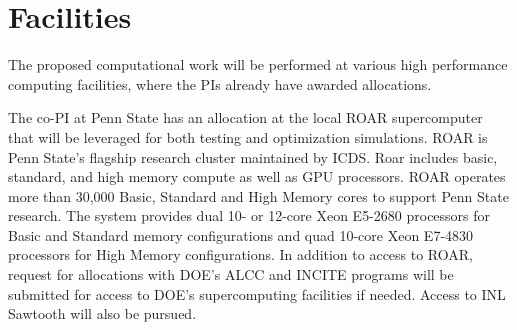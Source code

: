 \section{Facilities}
The proposed computational work will be performed at various high performance computing facilities, where the PIs already have awarded allocations.

The co-PI at Penn State has an allocation at the local ROAR supercomputer that will be leveraged for both testing and optimization simulations. ROAR is Penn State’s flagship research cluster maintained by ICDS. Roar includes basic, standard, and high memory compute as well as GPU processors. ROAR operates more than 30,000
Basic, Standard and High Memory cores to support Penn State research. The system provides dual 10- or 12-core Xeon E5-2680 processors for Basic and Standard memory configurations and quad 10-core Xeon E7-4830 processors for High Memory configurations. In addition to access to ROAR, request for allocations with DOE’s ALCC and INCITE programs will be submitted for access to DOE’s supercomputing facilities if needed. Access to INL Sawtooth will also be pursued.
%
%
%
%
%
%
